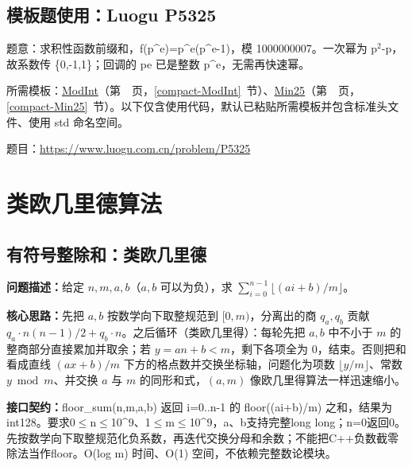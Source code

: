 \Needspace{312pt}

\subsection*{模板题使用：Luogu P5325}

\label{usage-example-104}

题意：求积性函数前缀和，f(p\textasciicircum{}e)=p\textasciicircum{}e(p\textasciicircum{}e-1)，模 1000000007。一次幂为 p$^{2}$-p，故系数传 \{0,-1,1\}；回调的 pe 已是整数 p\textasciicircum{}e，无需再快速幂。

所需模板：\hyperref[compact-ModInt]{ModInt}（第~\pageref{compact-ModInt}~页，\ref{compact-ModInt}~节）、\hyperref[compact-Min25]{Min25}（第~\pageref{compact-Min25}~页，\ref{compact-Min25}~节）。以下仅含使用代码，默认已粘贴所需模板并包含标准头文件、使用 std 命名空间。

题目：\url{https://www.luogu.com.cn/problem/P5325}



\Needspace{546pt}

\section{类欧几里德算法}

\subsection{有符号整除和：类欧几里德}\label{compact-floor_sum}

\noindent\textbf{问题描述：}\allowbreak 给定 $n,m,a,b$（$a,b$ 可以为负），求 $\sum_{i=0}^{n-1}\lfloor(ai+b)/m\rfloor$。

\textbf{核心思路：}\allowbreak 先把 $a,b$ 按数学向下取整规范到 $[0,m)$，分离出的商 $q_a,q_b$ 贡献 $q_a\cdot n(n-1)/2+q_b\cdot n$。之后循环（类欧几里得）：每轮先把 $a,b$ 中不小于 $m$ 的整商部分直接累加并取余；若 $y=an+b<m$，剩下各项全为 0，结束。否则把和看成直线 $(ax+b)/m$ 下方的格点数并交换坐标轴，问题化为项数 $\lfloor y/m\rfloor$、常数 $y\bmod m$、并交换 $a$ 与 $m$ 的同形和式，$(a,m)$ 像欧几里得算法一样迅速缩小。



{\sloppy{}\noindent\textbf{接口契约：}floor\_sum(n,m,a,b) 返回 i=0..n-1 的 floor((ai+b)/m) 之和，结果为 int128。要求0$\le$n$\le$10\textasciicircum{}9、1$\le$m$\le$10\textasciicircum{}9，a、b支持完整long long；n=0返回0。先按数学向下取整规范化负系数，再迭代交换分母和余数；不能把C++负数截零除法当作floor。O(log m) 时间、O(1) 空间，不依赖完整数论模块。\par}

